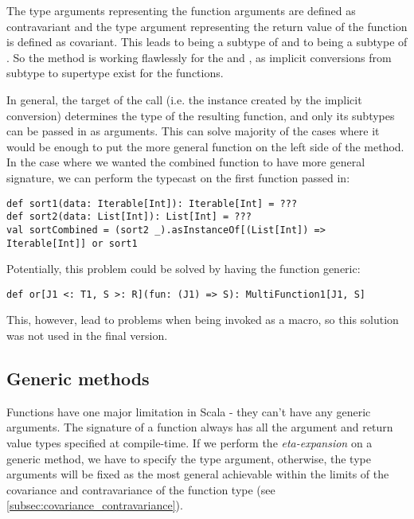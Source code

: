 The type arguments representing the function arguments are defined as contravariant and the type argument representing the return value of the function is defined as covariant. This leads to  being a subtype of  and to  being a subtype of . So the  method is working flawlessly for the  and , as implicit conversions from subtype to supertype exist for the functions.

In general, the target of the  call (i.e. the  instance created by the implicit conversion) determines the type of the resulting function, and only its subtypes can be passed in as arguments. This can solve majority of the cases where it would be enough to put the more general function on the left side of the  method. In the case where we wanted the combined function to have more general signature, we can perform the typecast on the first function passed in:

\lstset{style=Scala}
\begin{lstlisting}
def sort1(data: Iterable[Int]): Iterable[Int] = ???
def sort2(data: List[Int]): List[Int] = ???
val sortCombined = (sort2 _).asInstanceOf[(List[Int]) => Iterable[Int]] or sort1
\end{lstlisting}

Potentially, this problem could be solved by having the  function generic:
\lstset{style=Scala}
\begin{lstlisting}
def or[J1 <: T1, S >: R](fun: (J1) => S): MultiFunction1[J1, S]
\end{lstlisting}
This, however, lead to problems when being invoked as a macro, so this solution was not used in the final version.

\subsection{Generic methods}
\label{subsec:generics}



Functions have one major limitation in Scala - they can't have any generic arguments. The signature of a function always has all the argument and return value types specified at compile-time. If we perform the \textit{eta-expansion} on a generic method, we have to specify the type argument, otherwise, the type arguments will be fixed as the most general achievable within the limits of the covariance and contravariance of the function type (see \ref{subsec:covariance_contravariance}).

